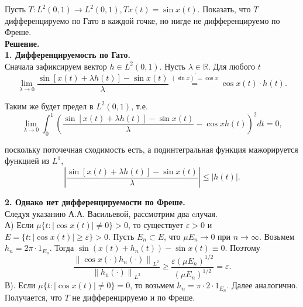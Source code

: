 \begin{task}
Пусть $T: L^2(0,1) \rightarrow L^2(0,1), T x(t)=\sin x(t)$. Показать, что $T$ дифференцируемо по Гато в каждой гочке, но нигде не дифференцируемо по Фреше.
\\
\textbf{Решение.} \\

\textbf{1. Дифференцируемость по Гато.} \\
Сначала зафиксируем вектор $h \in L^2(0,1)$. Нусть $\lambda \in \mathbb{R}$. Для любого $t$
$$
\lim _{\lambda \rightarrow 0} \frac{\sin [x(t)+\lambda h(t)]-\sin x(t)}{\lambda} \stackrel{(\sin x)^{\prime}=\cos x}{=} \cos x(t) \cdot h(t) .
$$

Таким же будет предел в $L^2(0,1)$, т.е.
$$
\lim _{\lambda \rightarrow 0} \int_0^1\left(\frac{\sin [x(t)+\lambda h(t)]-\sin x(t)}{\lambda}-\cos x h(t)\right)^2 d t=0,
$$

поскольку поточечная сходимость есть, а подинтегральная функция мажорируется функцией из $L^1$,
$$
\left|\frac{\sin [x(t)+\lambda h(t)]-\sin x(t)}{\lambda}\right| \leq|h(t)|.
$$

\textbf{2. Однако нет дифференцируемости по Фреше.} \\
Следуя указанию А.А. Васильевой, рассмотрим два cлучая.
\\
А) Если $\mu\{t:|\cos x(t)| \neq 0\}>0$, то существует $\varepsilon>0$ и $E=\{t:|\cos x(t)| \geq \varepsilon\}>0$. 
Пусть $E_n \subset E$, что $\mu E_n \rightarrow 0$ при $n \rightarrow \infty$. Возьмем $h_n=2 \pi \cdot 1_{E_n}$. Тогда $\sin \left(x(t)+h_n(t)\right)-\sin x(t) \equiv 0$. Поэтому
$$
\frac{\left\|\cos x(\cdot) h_n(\cdot)\right\|_{L^2}}{\left\|h_{\mathrm{n}}(\cdot)\right\|_{L^2}} \geq \frac{\varepsilon\left(\mu E_n\right)^{1 / 2}}{\left(\mu E_n\right)^{1 / 2}}=\varepsilon .
$$
В). Если $\mu\{t:|\cos x(t)| \neq 0\}=0$, то возьмем $h_n=\pi \cdot 2 \cdot 1_{E_n}$. Далее аналогично. Получается, что $T$ не дифференцируемо и по Фреше.

\end{task}